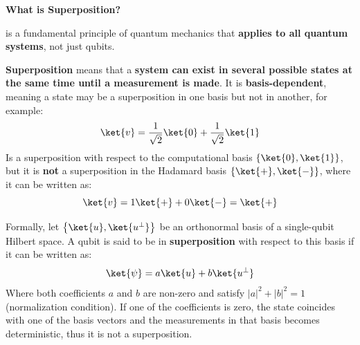 \highspace
\begin{flushleft}
    \textcolor{Green3}{ \textbf{What is Superposition?}}
\end{flushleft}
 is a fundamental principle of quantum mechanics that \textbf{applies to all quantum systems}, not just qubits.
\begin{definitionbox}[: Superposition]
    \textbf{Superposition} means that a \textbf{system can exist in several possible states at the same time until a measurement is made}. It is \textbf{basis-dependent}, meaning a state may be a superposition in one basis but not in another, for example:
    \begin{equation*}
        \ket{v} = \frac{1}{\sqrt{2}}\ket{0} + \frac{1}{\sqrt{2}}\ket{1}
    \end{equation*}
    Is a superposition with respect to the computational basis $\{\ket{0}, \ket{1}\}$, but it is \textbf{not} a superposition in the Hadamard basis $\{\ket{+}, \ket{-}\}$, where it can be written as:
    \begin{equation*}
        \ket{v} = 1\ket{+} + 0\ket{-} = \ket{+}
    \end{equation*}

    \highspace
    Formally, let $\left\{\ket{u}, \ket{u^{\perp}}\right\}$ be an orthonormal basis of a single-qubit Hilbert space. A qubit is said to be in \textbf{superposition} with respect to this basis if it can be written as:
    \begin{equation*}
        \ket{\psi} = a\ket{u} + b\ket{u^{\perp}}
    \end{equation*}
    Where both coefficients $a$ and $b$ are non-zero and satisfy $\left|a\right|^{2} + \left|b\right|^{2} = 1$ (normalization condition). If one of the coefficients is zero, the state coincides with one of the basis vectors and the measurements in that basis becomes deterministic, thus it is not a superposition.
\end{definitionbox}

